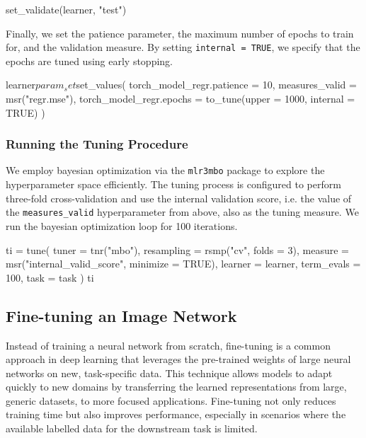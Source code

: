 \documentclass[article, nojss]{jss}
\theoremstyle{definition}
\begin{document}
\begin{CodeInput}
set_validate(learner, "test") 
\end{CodeInput}

Finally, we set the patience parameter, the maximum number of epochs to train for, and the validation measure.
By setting \texttt{internal = TRUE}, we specify that the epochs are tuned using early stopping.

\begin{CodeInput}
learner$param_set$set_values(
  torch_model_regr.patience = 10,
  measures_valid = msr("regr.mse"),
  torch_model_regr.epochs = to_tune(upper = 1000, internal = TRUE)
)
\end{CodeInput}

\subsubsection{Running the Tuning Procedure}

We employ bayesian optimization via the \texttt{mlr3mbo} package to explore the hyperparameter space efficiently.
The tuning process is configured to perform three-fold cross-validation and use the internal validation score, i.e. the value of the \texttt{measures\_valid} hyperparameter from above, also as the tuning measure.
We run the bayesian optimization loop for 100 iterations.

\begin{CodeInput}
ti = tune(
  tuner = tnr("mbo"),
  resampling = rsmp("cv", folds = 3),
  measure = msr("internal_valid_score", minimize = TRUE),
  learner = learner,
  term_evals = 100,
  task = task
)
ti
\end{CodeInput}

\subsection{Fine-tuning an Image Network}\label{sec:finetuning}

Instead of training a neural network from scratch, fine-tuning is a common approach in deep learning that leverages the pre-trained weights of large neural networks on new, task-specific data.
This technique allows models to adapt quickly to new domains by transferring the learned representations from large, generic datasets, to more focused applications.
Fine-tuning not only reduces training time but also improves performance, especially in scenarios where the available labelled data for the downstream task is limited.
\end{document}
